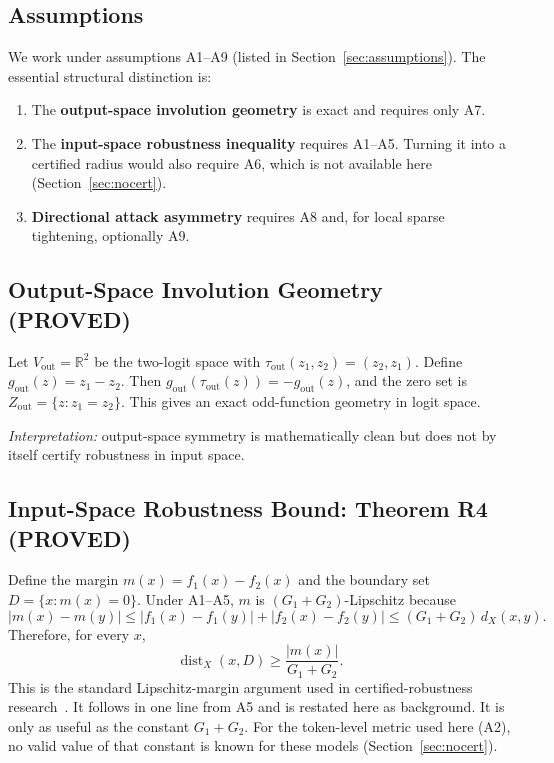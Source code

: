\documentclass[11pt]{article}
\newcommand{\lab}[1]{{\footnotesize\MakeUppercase{#1}}}
\newcommand{\proved}{\lab{proved}}
\begin{document}
\subsection{Assumptions}
We work under assumptions A1--A9 (listed in Section~\ref{sec:assumptions}). The essential structural distinction is:
\begin{enumerate}
  \item The \textbf{output-space involution geometry} is exact and requires only A7.
  \item The \textbf{input-space robustness inequality} requires A1--A5. Turning it into a certified radius would also require A6, which is not available here (Section~\ref{sec:nocert}).
  \item \textbf{Directional attack asymmetry} requires A8 and, for local sparse tightening, optionally A9.
\end{enumerate}

\subsection{Output-Space Involution Geometry (\proved)}
Let $V_{\mathrm{out}} = \mathbb{R}^2$ be the two-logit space with $\tau_{\mathrm{out}}(z_1, z_2) = (z_2, z_1)$. Define $g_{\mathrm{out}}(z) = z_1 - z_2$. Then $g_{\mathrm{out}}(\tau_{\mathrm{out}}(z)) = -g_{\mathrm{out}}(z)$, and the zero set is $Z_{\mathrm{out}} = \{z : z_1 = z_2\}$. This gives an exact odd-function geometry in logit space.

\emph{Interpretation:} output-space symmetry is mathematically clean but does not by itself certify robustness in input space.

\subsection{Input-Space Robustness Bound: Theorem R4 (\proved)}
Define the margin $m(x) = f_1(x) - f_2(x)$ and the boundary set $D = \{x : m(x) = 0\}$. Under A1--A5, $m$ is $(G_1 + G_2)$-Lipschitz because
\[
|m(x) - m(y)| \le |f_1(x) - f_1(y)| + |f_2(x) - f_2(y)| \le (G_1 + G_2)\, d_X(x, y).
\]
Therefore, for every $x$,
\[
\operatorname{dist}_X(x, D) \ge \frac{|m(x)|}{G_1 + G_2}.
\]
This is the standard Lipschitz-margin argument used in certified-robustness research~\cite{hein2017,tsuzuku2018}. It follows in one line from A5 and is restated here as background. It is only as useful as the constant $G_1 + G_2$. For the token-level metric used here (A2), no valid value of that constant is known for these models (Section~\ref{sec:nocert}).
\end{document}
